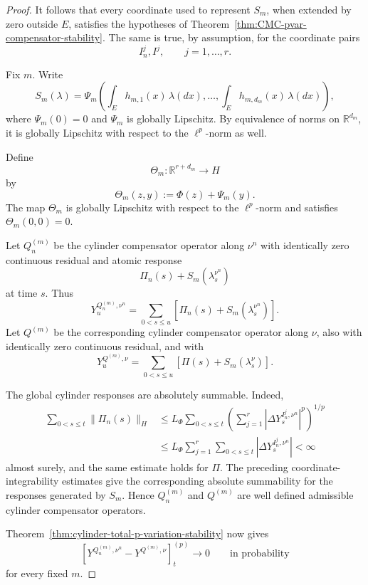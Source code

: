 \documentclass[a4paper,10pt]{article}
\begin{document}
\begin{proof}
It follows that every coordinate used to represent \(S_m\), when
extended by zero outside \(E\), satisfies the hypotheses of
Theorem~\ref{thm:CMC-pvar-compensator-stability}. The same is true,
by assumption, for the coordinate pairs
\[
        I_n^j,I^j,
        \qquad j=1,\ldots,r.
\]

Fix \(m\). Write
\[
S_m(\lambda)
=
\Psi_m\left(
        \int_Eh_{m,1}(x)\,\lambda(dx),
        \ldots,
        \int_Eh_{m,d_m}(x)\,\lambda(dx)
\right),
\]
where \(\Psi_m(0)=0\) and \(\Psi_m\) is globally Lipschitz. By
equivalence of norms on \(\mathbb R^{d_m}\), it is globally Lipschitz
with respect to the \(\ell^p\)-norm as well.

Define
\[
\Theta_m:
\mathbb R^{r+d_m}
\longrightarrow H
\]
by
\[
        \Theta_m(z,y):=\Phi(z)+\Psi_m(y).
\]
The map \(\Theta_m\) is globally Lipschitz with respect to the
\(\ell^p\)-norm and satisfies
$
        \Theta_m(0,0)=0.
$

Let \(Q_n^{(m)}\) be the cylinder compensator operator along
\(\nu^n\) with identically zero continuous residual and atomic
response
\[
        \Pi_n(s)+S_m(\lambda_s^{\nu^n})
\]
at time \(s\). Thus
\[
Y_u^{Q_n^{(m)},\nu^n}
=
\sum_{0<s\le u}
\left[
        \Pi_n(s)+S_m(\lambda_s^{\nu^n})
\right].
\]
Let \(Q^{(m)}\) be the corresponding cylinder compensator operator
along \(\nu\), also with identically zero continuous residual, and
with
\[
Y_u^{Q^{(m)},\nu}
=
\sum_{0<s\le u}
\left[
        \Pi(s)+S_m(\lambda_s^\nu)
\right].
\]

The global cylinder responses are absolutely summable. Indeed,
\[
\begin{aligned}
\sum_{0<s\le t}\lVert\Pi_n(s)\rVert_H
&\le
L_\Phi
\sum_{0<s\le t}
\left(
        \sum_{j=1}^r
        \left|
        \Delta Y_s^{I_n^j,\nu^n}
        \right|^p
\right)^{1/p}
\\
&\le
L_\Phi
\sum_{j=1}^r
\sum_{0<s\le t}
\left|
        \Delta Y_s^{I_n^j,\nu^n}
\right|
<
\infty
\end{aligned}
\]
almost surely, and the same estimate holds for \(\Pi\). The preceding
coordinate-integrability estimates give the corresponding absolute
summability for the responses generated by \(S_m\). Hence
\(Q_n^{(m)}\) and \(Q^{(m)}\) are well defined admissible cylinder
compensator operators.

Theorem~\ref{thm:cylinder-total-p-variation-stability} now gives
\[
\left[
Y^{Q_n^{(m)},\nu^n}
-
Y^{Q^{(m)},\nu}
\right]^{(p)}_t
\longrightarrow0
\qquad\text{in probability}
\]
for every fixed \(m\).


\end{proof}
\end{document}
